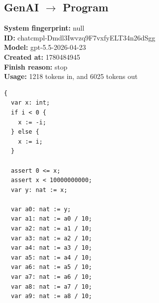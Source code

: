 \documentclass{article}
\begin{document}
\subsection*{GenAI $\rightarrow$ Program}
\textbf{System fingerprint: }null
\\\textbf{ID: }chatcmpl-Dmdl3Iwvzq9F7vxfyELT34n26dSgg
\\\textbf{Model: }gpt-5.5-2026-04-23
\\\textbf{Created at: }1780484945
\\\textbf{Finish reason: }stop
\\\textbf{Usage: }1218 tokens in, and 6025 tokens out
\begin{lstlisting}
{
  var x: int;
  if i < 0 {
    x := -i;
  } else {
    x := i;
  }

  assert 0 <= x;
  assert x < 10000000000;
  var y: nat := x;

  var a0: nat := y;
  var a1: nat := a0 / 10;
  var a2: nat := a1 / 10;
  var a3: nat := a2 / 10;
  var a4: nat := a3 / 10;
  var a5: nat := a4 / 10;
  var a6: nat := a5 / 10;
  var a7: nat := a6 / 10;
  var a8: nat := a7 / 10;
  var a9: nat := a8 / 10;


\end{lstlisting}
\end{document}
